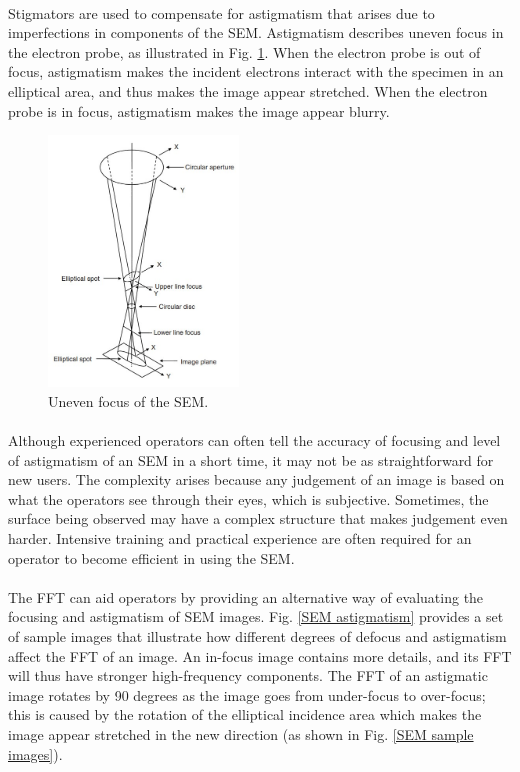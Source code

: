 \documentclass[12pt, twocolumn]{report}
\begin{document}
\paragraph{}
Stigmators are used to compensate for astigmatism that arises due to imperfections in components of the SEM. Astigmatism describes uneven focus in the electron probe, as illustrated in Fig. \ref{SEM uneven focus}. When the electron probe is out of focus, astigmatism makes the incident electrons interact with the specimen in an elliptical area, and thus makes the image appear stretched. When the electron probe is in focus, astigmatism makes the image appear blurry.

\begin{figure}[htbp]
    \centering
    \includegraphics[width=0.45\textwidth]{Figures/SEM uneven focus.jpg}
    \caption{Uneven focus of the SEM.}
    \label{SEM uneven focus}
\end{figure}

\paragraph{}
Although experienced operators can often tell the accuracy of focusing and level of astigmatism of an SEM in a short time, it may not be as straightforward for new users. The complexity arises because any judgement of an image is based on what the operators see through their eyes, which is subjective. Sometimes, the surface being observed may have a complex structure that makes judgement even harder. Intensive training and practical experience are often required for an operator to become efficient in using the SEM.

\paragraph{}
The FFT can aid operators by providing an alternative way of evaluating the focusing and astigmatism of SEM images. Fig. \ref{SEM astigmatism} provides a set of sample images that illustrate how different degrees of defocus and astigmatism affect the FFT of an image. An in-focus image contains more details, and its FFT will thus have stronger high-frequency components. The FFT of an astigmatic image rotates by 90 degrees as the image goes from under-focus to over-focus; this is caused by the rotation of the elliptical incidence area which makes the image appear stretched in the new direction (as shown in Fig. \ref{SEM sample images}).
\end{document}
